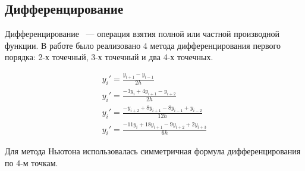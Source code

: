 \subsection{Дифференцирование}

Дифференцирование ~--- операция взятия полной или частной производной функции. В работе было реализовано 4 метода
дифференцирования первого порядка: 2-х точечный, 3-х точечный и два 4-х точечных.

\begin{equation}
    \begin{gathered}
        y_i' = \frac{y_{i+1} - y_{i-1}}{2h}\\
        y_i' = \frac{-3y_{i} + 4y_{i+1} - y_{i+2}}{2h}\\
        y_i' = \frac{-y_{i+2} + 8y_{i+1} - 8y_{i-1} + y_{i-2}}{12h}\\
        y_i' = \frac{-11y_{i} + 18y_{i+1} - 9y_{i+2} + 2y_{i+3}}{6h}
    \end{gathered}
    \label{eq:Diff}
\end{equation}

Для метода Ньютона использовалась симметричная формула дифференцирования по 4-м точкам.
